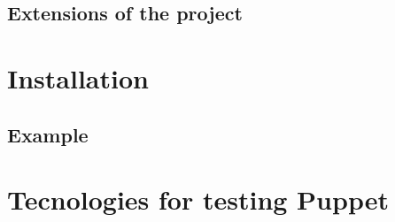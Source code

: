 \documentclass[12pt,a4paper,openright,twoside]{book}
\begin{document}





\subsection{Extensions of the project}

\section{Installation}
\subsection{Example}

\section{Tecnologies for testing Puppet}

\end{document}
